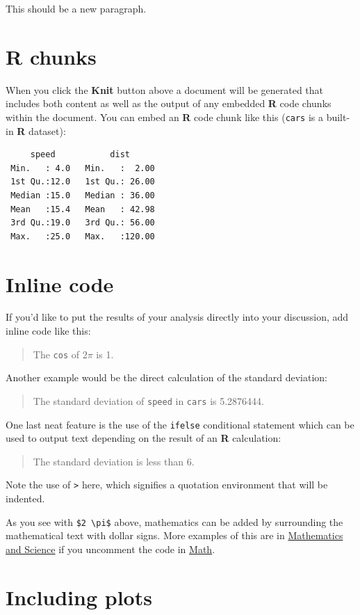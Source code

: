 \documentclass[12pt,twoside]{reedthesis}
\begin{document}
This should be a new paragraph.

\hypertarget{r-chunks}{%
\section{R chunks}\label{r-chunks}}

When you click the \textbf{Knit} button above a document will be generated that includes both content as well as the output of any embedded \textbf{R} code chunks within the document. You can embed an \textbf{R} code chunk like this (\texttt{cars} is a built-in \textbf{R} dataset):
\begin{verbatim}
     speed           dist       
 Min.   : 4.0   Min.   :  2.00  
 1st Qu.:12.0   1st Qu.: 26.00  
 Median :15.0   Median : 36.00  
 Mean   :15.4   Mean   : 42.98  
 3rd Qu.:19.0   3rd Qu.: 56.00  
 Max.   :25.0   Max.   :120.00  
\end{verbatim}
\hypertarget{inline-code}{%
\section{Inline code}\label{inline-code}}

If you'd like to put the results of your analysis directly into your discussion, add inline code like this:
\begin{quote}
The \texttt{cos} of \(2 \pi\) is 1.
\end{quote}
Another example would be the direct calculation of the standard deviation:
\begin{quote}
The standard deviation of \texttt{speed} in \texttt{cars} is 5.2876444.
\end{quote}
One last neat feature is the use of the \texttt{ifelse} conditional statement which can be used to output text depending on the result of an \textbf{R} calculation:
\begin{quote}
The standard deviation is less than 6.
\end{quote}
Note the use of \texttt{\textgreater{}} here, which signifies a quotation environment that will be indented.

As you see with \texttt{\$2\ \textbackslash{}pi\$} above, mathematics can be added by surrounding the mathematical text with dollar signs. More examples of this are in \protect\hyperlink{math-sci}{Mathematics and Science} if you uncomment the code in \protect\hyperlink{math}{Math}.

\hypertarget{including-plots}{%
\section{Including plots}\label{including-plots}}
\end{document}
